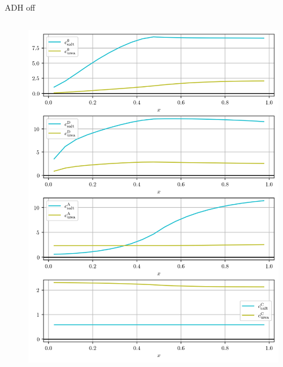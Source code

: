 \documentclass{beamer}
\begin{document}
\begin{frame}{ADH off}
\begin{columns}[T]
    \begin{column}{0.5\textwidth}
        \begin{figure}
            \centering
            \includegraphics[width=\textwidth]{results/4-7-2023/noADH_c.png}
        \end{figure}
    \end{column}

\end{columns}
    
\end{frame}
\end{document}
